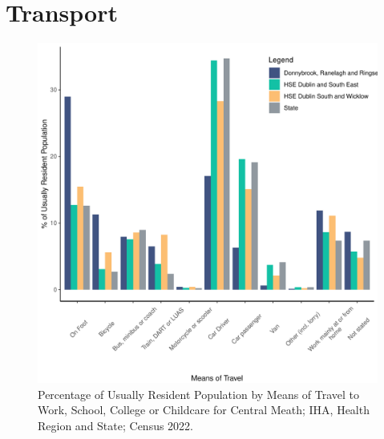 \documentclass{article}
\begin{document}
\section{Transport}\label{sect:Trans}
\begin{figure}[H]
	\centering
	\includegraphics[width = 120mm]{../figures/TravelED.pdf}
	\caption{Percentage of Usually Resident Population by Means of Travel to Work, School, College or Childcare for Central Meath; IHA, Health Region and State; Census 2022.}
	\label{fig:vbnv}
	\end{figure}
\end{document}
